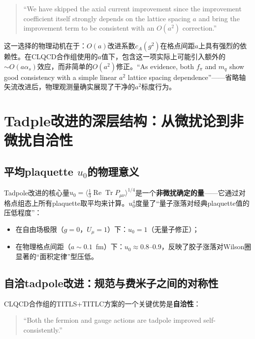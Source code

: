 \documentclass[12pt,a4paper]{ctexart}
\theoremstyle{definition}
\begin{document}
\begin{quote}
``We have skipped the axial current improvement since the improvement coefficient itself strongly depends on the lattice spacing $a$ and bring the improvement term to be consistent with an $O(a^2)$ correction.''
\end{quote}

这一选择的物理动机在于：$O(a)$改进系数$c_A(g^2)$在格点间距$a$上具有强烈的依赖性。在CLQCD合作组使用的$a$值下，包含这一项实际上可能引入额外的$\sim O(a\alpha_s)$效应，而非简单的$O(a^2)$修正。``As evidence, both $f_\pi$ and $m_q$ show good consistency with a simple linear $a^2$ lattice spacing dependence''\cite{CLQCD2025quark_mass}——省略轴矢流改进后，物理观测量确实展现了干净的$a^2$标度行为。

\section{Tadple改进的深层结构：从微扰论到非微扰自洽性}

\subsection{平均plaquette $u_0$的物理意义}

Tadpole改进的核心量$u_0 = \langle \frac{1}{3}\operatorname{Re}\operatorname{Tr} P_{\mu\nu} \rangle^{1/4}$是一个\textbf{非微扰确定的量}——它通过对格点组态上所有plaquette取平均来计算。$u_0^4$度量了``量子涨落对经典plaquette值的压低程度''：

\begin{itemize}
    \item 在自由场极限（$g=0$，$U_\mu = 1$）下：$u_0 = 1$（无量子修正）；
    \item 在物理格点间距（$a \sim 0.1$~fm）下：$u_0 \approx 0.8\text{--}0.9$，反映了胶子涨落对Wilson圈显著的``面积定律''型压低。
\end{itemize}

\subsection{自洽tadpole改进：规范与费米子之间的对称性}

CLQCD合作组的TITLS+TITLC方案的一个关键优势是\textbf{自洽性}\cite{CLQCD2025quark_mass}：

\begin{quote}
``Both the fermion and gauge actions are tadpole improved self-consistently.''
\end{quote}
\end{document}
